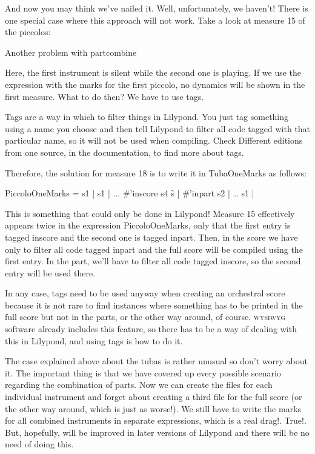 \documentclass[../../LilyPond-Tutorials]{subfiles}
\begin{document}
And now you may think we've nailed it.
Well, unfortunately, we haven't!
There is one special case where this approach will not work.
Take a look at measure 15 of the piccolos:

\begin{musicExample}
\caption{Another problem with partcombine}
\label{xmp:partcombine-example-three}
\end{musicExample}

Here, the first instrument is silent while the second one is playing.
If we use the expression with the marks for the first piccolo, no dynamics will be shown in the first measure.
What to do then?
We have to use tags.

Tags are a way in which to filter things in Lilypond.
You just tag something using a name you choose and then tell Lilypond to filter all code tagged with that particular name, so it will not be used when compiling.
Check Different editions from one source, in the documentation, to find more about tags.

Therefore, the solution for measure 18 is to write it in TubaOneMarks as follows:

\begin{lilypondcode}
PiccoloOneMarks = {
       s1 | %
       s1 | %
       ...
       \tag #'inscore { s4 s\f\< } | %
       \tag #'inpart { s2 } | %
       …
       s1 | %
}
\end{lilypondcode}

This is something that could only be done in Lilypond!
Measure 15 effectively appears twice in the expression PiccoloOneMarks, only that the first entry is tagged inscore and the second one is tagged inpart.
Then, in the score we have only to filter all code tagged inpart and the full score will be compiled using the first entry.
In the part, we'll have to filter all code tagged inscore, so the second entry will be used there.

In any case, tags need to be used anyway when creating an orchestral score because it is not rare to find instances where something has to be printed in the full score but not in the parts, or the other way around, of course.
\textsc{wysiwyg} software already includes this feature, so there has to be a way of dealing with this in Lilypond, and using tags is how to do it.

The case explained above about the tubas is rather unusual so don't worry about it.
The important thing is that we have covered up every possible scenario regarding the combination of parts.
Now we can create the files for each individual instrument and forget about creating a third file for the full score (or the other way around, which is just as worse!).
We still have to write the marks for all combined instruments in separate expressions, which is a real drag!.
True!.
But, hopefully,  will be improved in later versions of Lilypond and there will be no need of doing this.
\end{document}
